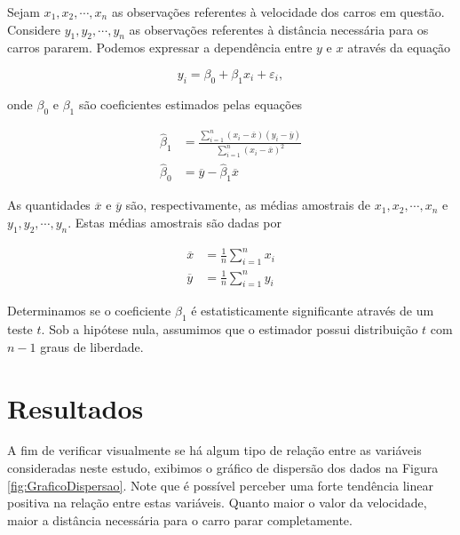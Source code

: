 \documentclass[a5paper,12pt,twoside,printwatermark=true]{modeloLEA}
\numberwithin{equation}{section}
\numberwithin{figure}{section}
\numberwithin{table}{section}
\begin{document}
Sejam \(x_1, x_2, \cdots, x_n\) as observações referentes à velocidade
dos carros em questão. Considere \(y_1, y_2, \cdots, y_n\) as
observações referentes à distância necessária para os carros pararem.
Podemos expressar a dependência entre \(y\) e \(x\) através da equação

\begin{equation}
y_i = \beta_0 + \beta_1x_i + \varepsilon_i,
\end{equation}

\noindent onde \(\beta_0\) e \(\beta_1\) são coeficientes estimados
pelas equações

\begin{align}
\widehat{\beta}_1 &= \frac{\sum_{i=1}^n(x_i-\overline{x})(y_i-\overline{y})}{\sum_{i=1}^n(x_i-\overline{x})^2}  \label{estimadores01} \\
\widehat{\beta}_0 &= \overline{y}-\widehat{\beta}_1\overline{x}  \label{estimadores02}
\end{align}

\noindent As quantidades \(\overline{x}\) e \(\overline{y}\) são,
respectivamente, as médias amostrais de \(x_1, x_2, \cdots, x_n\) e
\(y_1, y_2, \cdots, y_n\). Estas médias amostrais são dadas por

\begin{align}
\overline{x} &= \frac{1}{n}\sum_{i=1}^nx_i \\
\overline{y} &= \frac{1}{n}\sum_{i=1}^ny_i 
\end{align}

Determinamos se o coeficiente \(\beta_1\) é estatisticamente
significante através de um teste \(t\). Sob a hipótese nula, assumimos
que o estimador possui distribuição \(t\) com \(n-1\) graus de
liberdade.

\hypertarget{resultados}{%
\section{Resultados}\label{resultados}}

A fim de verificar visualmente se há algum tipo de relação entre as
variáveis consideradas neste estudo, exibimos o gráfico de dispersão dos
dados na Figura \ref{fig:GraficoDispersao}. Note que é possível perceber
uma forte tendência linear positiva na relação entre estas variáveis.
Quanto maior o valor da velocidade, maior a distância necessária para o
carro parar completamente.

\begin{Shaded}
\begin{Highlighting}[]
\NormalTok{(}\OperatorTok{+}
\StringTok{  }\NormalTok{() }\OperatorTok{+}
\StringTok{  }\NormalTok{(}\NormalTok{, }\NormalTok{)}
\end{Highlighting}
\end{Shaded}
\end{document}
